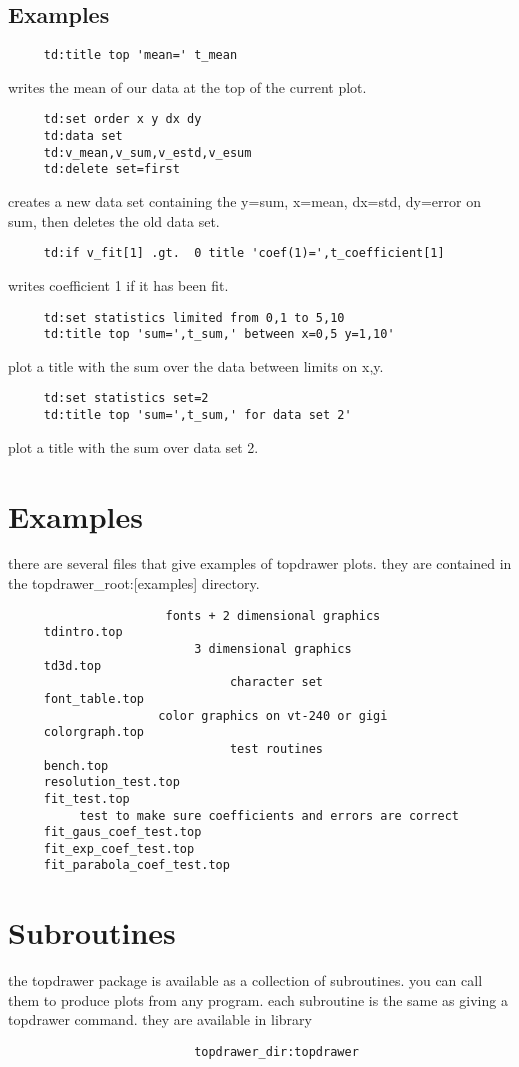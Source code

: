 \subsection{Examples}
\begin{verbatim}
     td:title top 'mean=' t_mean 
\end{verbatim}
writes the mean of our data at the top of the current plot.  
\begin{verbatim}
     td:set order x y dx dy 
     td:data set 
     td:v_mean,v_sum,v_estd,v_esum 
     td:delete set=first 
\end{verbatim}
creates  a new data set containing the y=sum, x=mean, dx=std, dy=error on
sum, then deletes the old data set.  
\begin{verbatim}
     td:if v_fit[1] .gt.  0 title 'coef(1)=',t_coefficient[1] 
\end{verbatim}
writes coefficient 1 if it has been fit.  
\begin{verbatim}
     td:set statistics limited from 0,1 to 5,10 
     td:title top 'sum=',t_sum,' between x=0,5 y=1,10' 
\end{verbatim}
plot a title with the sum over the data between limits on x,y.  
\begin{verbatim}
     td:set statistics set=2 
     td:title top 'sum=',t_sum,' for data set 2' 
\end{verbatim}
plot a title with the sum over data set 2.  
\section{Examples}
there  are  several  files that give examples of topdrawer plots.  they are
contained in the topdrawer\_root:[examples] directory.  
\begin{verbatim}
                      fonts + 2 dimensional graphics
     tdintro.top 
                          3 dimensional graphics
     td3d.top 
                               character set
     font_table.top 
                     color graphics on vt-240 or gigi
     colorgraph.top 
                               test routines
     bench.top 
     resolution_test.top 
     fit_test.top 
          test to make sure coefficients and errors are correct 
     fit_gaus_coef_test.top 
     fit_exp_coef_test.top 
     fit_parabola_coef_test.top 
\end{verbatim}
\section{Subroutines}
the topdrawer package is available as a collection of subroutines.  you can
call them to produce plots from any program.  each subroutine is  the  same
as giving a topdrawer command.  they are available in library 
\begin{verbatim}
                          topdrawer_dir:topdrawer
\end{verbatim}
